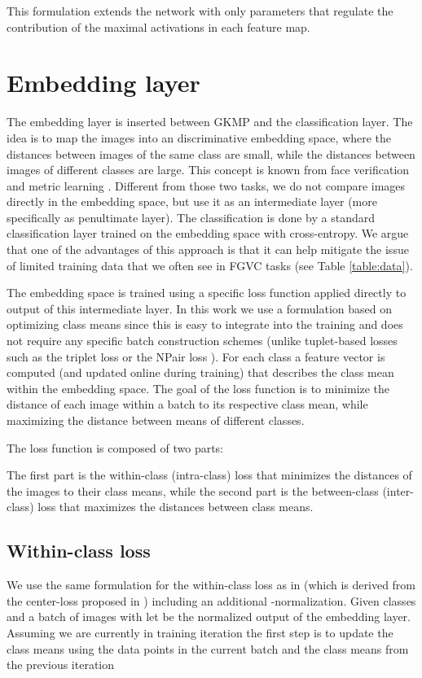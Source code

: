 \documentclass[10pt,twocolumn,letterpaper]{article}
\begin{document}
This formulation extends the network with only  parameters that regulate the contribution of the  maximal activations in each feature map.


\section{Embedding layer}
\label{section:emb}


The embedding layer is inserted between GKMP and the classification layer. The idea is to map the images into an discriminative embedding space, where the distances between images of the same class are small, while the distances between images of different classes are large. This concept is known from face verification \cite{schroff2015facenet,wen2016discriminative,hanselmann2017deep} and metric learning \cite{rippel2015metric}. Different from those two tasks, we do not compare images directly in the embedding space, but use it as an intermediate layer (more specifically as penultimate layer). The classification is done by a standard classification layer trained on the embedding space with cross-entropy. We argue that one of the advantages of this approach is that it can help mitigate the issue of limited training data that we often see in FGVC tasks (see Table \ref{table:data}).

The embedding space is trained using a specific loss function  applied directly to output of this intermediate layer. In this work we use a formulation based on optimizing class means \cite{wen2016discriminative,hanselmann2017deep} since this is easy to integrate into the training and does not require any specific batch construction schemes (unlike tuplet-based losses such as the triplet loss \cite{schroff2015facenet} or the NPair loss \cite{sohn2016improved}). For each class  a feature vector is computed (and updated online during training) that describes the class mean  within the embedding space. The goal of the loss function  is to minimize the distance of each image within a batch to its respective class mean, while maximizing the distance between means of different classes. 

The loss function is composed of two parts:

The first part  is the within-class (intra-class) loss that minimizes the distances of the images to their class means, while the second part  is the between-class (inter-class) loss that maximizes the distances between class means.

\subsection{Within-class loss}
\label{section:intraLoss}
We use the same formulation for the within-class loss as in \cite{hanselmann2017deep} (which is derived from the center-loss proposed in \cite{wen2016discriminative}) including an additional -normalization. Given classes  and a batch of images  with  let  be the normalized output of the embedding layer. Assuming we are currently in training iteration  the first step is to update the class means using the data points in the current batch and the class means from the previous iteration 
\end{document}
